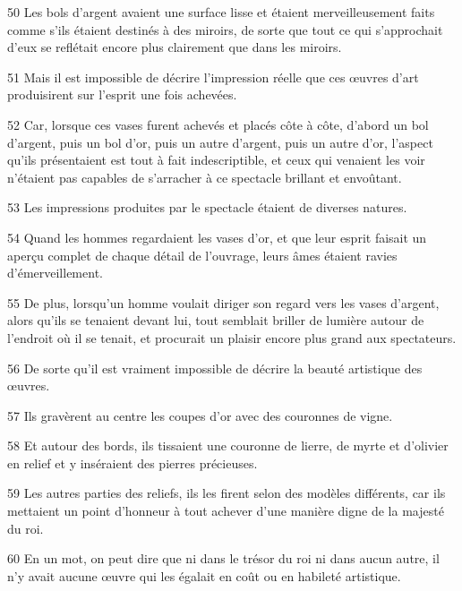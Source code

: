 \par 50 Les bols d'argent avaient une surface lisse et étaient merveilleusement faits comme s'ils étaient destinés à des miroirs, de sorte que tout ce qui s'approchait d'eux se reflétait encore plus clairement que dans les miroirs.

\par 51 Mais il est impossible de décrire l'impression réelle que ces œuvres d'art produisirent sur l'esprit une fois achevées.

\par 52 Car, lorsque ces vases furent achevés et placés côte à côte, d'abord un bol d'argent, puis un bol d'or, puis un autre d'argent, puis un autre d'or, l'aspect qu'ils présentaient est tout à fait indescriptible, et ceux qui venaient les voir n'étaient pas capables de s'arracher à ce spectacle brillant et envoûtant.

\par 53 Les impressions produites par le spectacle étaient de diverses natures.

\par 54 Quand les hommes regardaient les vases d'or, et que leur esprit faisait un aperçu complet de chaque détail de l'ouvrage, leurs âmes étaient ravies d'émerveillement.

\par 55 De plus, lorsqu'un homme voulait diriger son regard vers les vases d'argent, alors qu'ils se tenaient devant lui, tout semblait briller de lumière autour de l'endroit où il se tenait, et procurait un plaisir encore plus grand aux spectateurs.

\par 56 De sorte qu'il est vraiment impossible de décrire la beauté artistique des œuvres.

\par 57 Ils gravèrent au centre les coupes d'or avec des couronnes de vigne.

\par 58 Et autour des bords, ils tissaient une couronne de lierre, de myrte et d'olivier en relief et y inséraient des pierres précieuses.

\par 59 Les autres parties des reliefs, ils les firent selon des modèles différents, car ils mettaient un point d'honneur à tout achever d'une manière digne de la majesté du roi.

\par 60 En un mot, on peut dire que ni dans le trésor du roi ni dans aucun autre, il n'y avait aucune œuvre qui les égalait en coût ou en habileté artistique.

